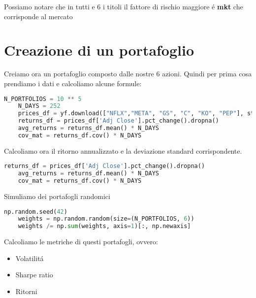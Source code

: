 \documentclass{report}
\begin{document}
Possiamo notare che in tutti e 6 i titoli il fattore di rischio maggiore é \textbf{mkt} che corrisponde al mercato

\chapter{Creazione di un portafoglio}
Creiamo ora un portafoglio composto dalle nostre 6 azioni. Quindi per prima cosa prendiamo i dati e calcoliamo alcune formule:
\begin{lstlisting}[language=python]
    N_PORTFOLIOS = 10 ** 5
    N_DAYS = 252
    prices_df = yf.download(["NFLX","META", "GS", "C", "KO", "PEP"], start, end, adjusted=True)
    returns_df = prices_df['Adj Close'].pct_change().dropna()
    avg_returns = returns_df.mean() * N_DAYS
    cov_mat = returns_df.cov() * N_DAYS
\end{lstlisting}
Calcoliamo ora il ritorno annualizzato e la deviazione standard corrispondente.
\begin{lstlisting}[language=python]
    returns_df = prices_df['Adj Close'].pct_change().dropna()
    avg_returns = returns_df.mean() * N_DAYS
    cov_mat = returns_df.cov() * N_DAYS
\end{lstlisting}
Simuliamo dei portafogli randomici
\begin{lstlisting}[language=python]
    np.random.seed(42)
    weights = np.random.random(size=(N_PORTFOLIOS, 6))
    weights /= np.sum(weights, axis=1)[:, np.newaxis]
\end{lstlisting}
Calcoliamo le metriche di questi portafogli, ovvero:

\begin{itemize}[leftmargin=30pt, rightmargin=2cm]
\item Volatilitá
\item Sharpe ratio
\item Ritorni
\end{itemize}
\end{document}

